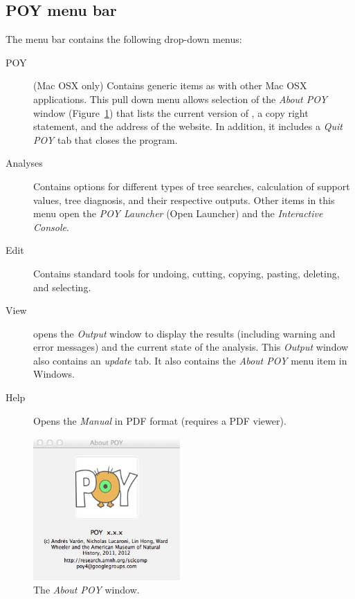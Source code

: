 \subsection{POY menu bar}
The menu bar contains the following drop-down menus:
\begin{description}
\item[POY] (Mac OSX only) Contains generic items as with other Mac OSX applications. This pull down 
menu allows selection of the \emph{About POY} window (Figure~\ref{fig:about_window}) that lists the 
current version of \poy, a copy right statement, and the address of the \poy website. In addition, it includes 
a \emph{Quit POY} tab that closes the program. 
\item[Analyses]    Contains options for different types of tree searches, calculation of support values, tree 
diagnosis, and their respective outputs. Other items in this menu open the \emph{POY Launcher} 
(Open Launcher) and the \emph{Interactive Console}.
\item[Edit] Contains standard tools for undoing, cutting, copying, pasting, deleting, and selecting.
\item[View] opens the \emph{Output} window to display the results (including warning and error messages) 
and the current state of the analysis. This \emph{Output} window also contains an \emph{update} tab.  
It also contains the \emph{About POY} menu item in Windows. %
\item[Help] Opens the \poy \emph{Manual} in PDF format (requires a PDF viewer).
\end{description}

\begin{figure}[htpb]
    \begin{center}
        \includegraphics[width=0.5\textwidth]{doc/figures/about_window.jpg}
    \end{center}
    \caption{The \emph{About POY} window.}
    \label{fig:about_window}
        
\end{figure}

